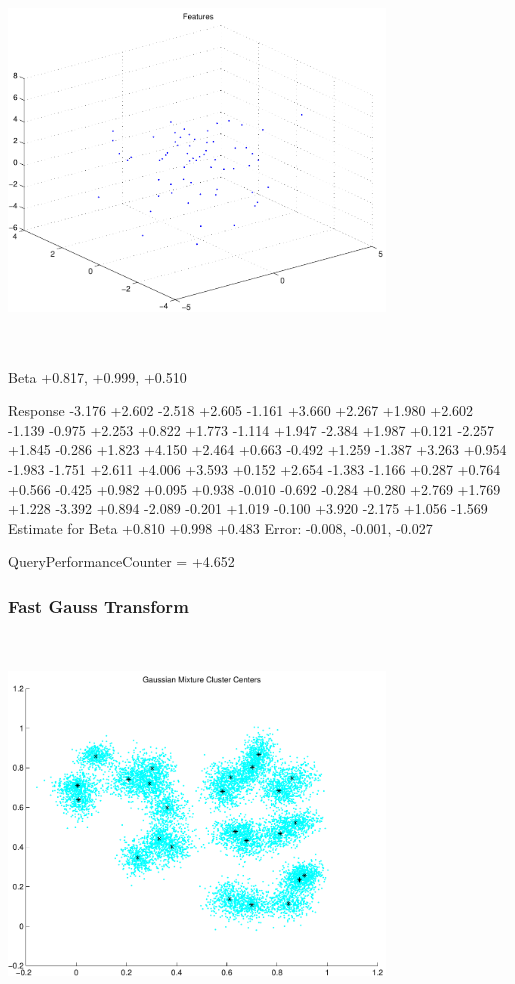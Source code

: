 \documentclass[9pt]{article}
\theoremstyle{plain}
\theoremstyle{definition}
\theoremstyle{remark}
\numberwithin{equation}{section}
\begin{document}
\includegraphics[width=10.0cm,height=10.0cm]{regression_features.pdf}

Beta
+0.817, +0.999, +0.510

Response
-3.176
+2.602
-2.518
+2.605
-1.161
+3.660
+2.267
+1.980
+2.602
-1.139
-0.975
+2.253
+0.822
+1.773
-1.114
+1.947
-2.384
+1.987
+0.121
-2.257
+1.845
-0.286
+1.823
+4.150
+2.464
+0.663
-0.492
+1.259
-1.387
+3.263
+0.954
-1.983
-1.751
+2.611
+4.006
+3.593
+0.152
+2.654
-1.383
-1.166
+0.287
+0.764
+0.566
-0.425
+0.982
+0.095
+0.938
-0.010
-0.692
-0.284
+0.280
+2.769
+1.769
+1.228
-3.392
+0.894
-2.089
-0.201
+1.019
-0.100
+3.920
-2.175
+1.056
-1.569
Estimate for Beta
+0.810
+0.998
+0.483
Error:
-0.008, -0.001, -0.027


QueryPerformanceCounter  =  +4.652
\subsubsection{Fast Gauss Transform}
\includegraphics[width=10.0cm,height=10.0cm]{GaussianMixture_ClusterCenters25_Centers.pdf}
\end{document}
